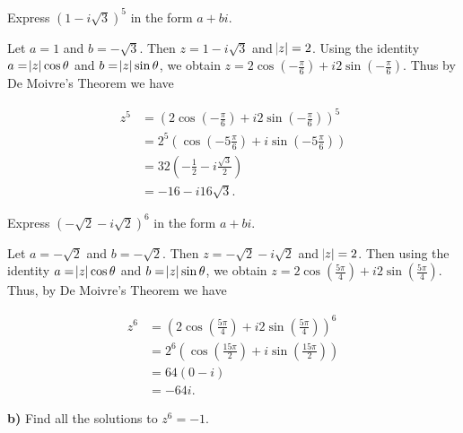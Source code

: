 \documentclass[12pt, a4paper]{article}
\begin{document}
 \begin{addmargin}[2.8em]{2.8em}

    Express $(1-i\sqrt{3})^5$ in the form $a+bi$.

    \vspace{4mm}

    \noindent Let $a=1$ and $b=-\sqrt{3}$. Then $z=1-i\sqrt{3}$ and $\abs{z}=2$. Using the identity $a=\abs{z}\cos{\theta}$ and $b=\abs{z}\sin{\theta}$, we obtain $z=2\cos{(-\frac{\pi}{6})}+i2\sin{(-\frac{\pi}{6})}$. Thus by De Moivre's Theorem we have
    
    \begin{equation*}
        \begin{split}
            z^5& =(2\cos{(-\frac{\pi}{6})}+i2\sin{(-\frac{\pi}{6})})^5 \\
            & =2^5(\cos{(-5\frac{\pi}{6})}+i\sin{(-5\frac{\pi}{6})}) \\
            & =32(-\frac{1}{2}-i\frac{\sqrt{3}}{2}) \\
            & =-16-i16\sqrt{3}.
        \end{split}
    \end{equation*}
    
    \vspace{4mm}
    
    \noindent Express $(-\sqrt{2}-i\sqrt{2})^6$ in the form $a+bi$.
    
    \vspace{4mm}
    
    \noindent Let $a=-\sqrt{2}$ and $b=-\sqrt{2}$. Then $z=-\sqrt{2}-i\sqrt{2}$ and $\abs{z}=2$. Then using the identity $a=\abs{z}\cos{\theta}$ and $b=\abs{z}\sin{\theta}$, we obtain $z=2\cos{(\frac{5\pi}{4})}+i2\sin{(\frac{5\pi}{4})}$. Thus, by De Moivre's Theorem we have
    
    \begin{equation*}
        \begin{split}
            z^6& =(2\cos{(\frac{5\pi}{4})}+i2\sin{(\frac{5\pi}{4})})^6 \\
            & =2^6(\cos{(\frac{15\pi}{2})}+i\sin{(\frac{15\pi}{2})}) \\  
            & =64(0-i) \\
            & =-64i.
        \end{split}
    \end{equation*}
    
\end{addmargin}

\par\textbf{b)} Find all the solutions to $z^6=-1$.
\end{document}
